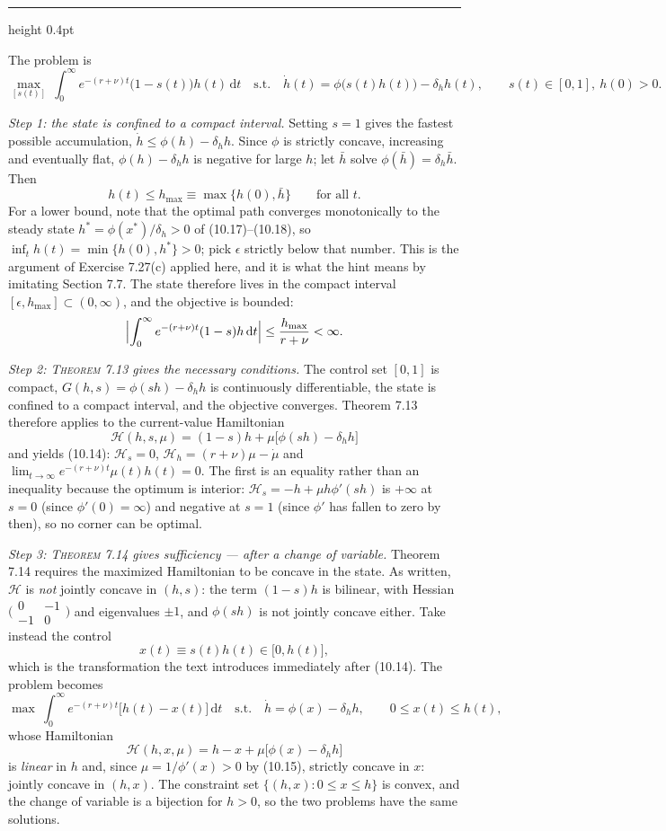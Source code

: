 \documentclass[11pt,letterpaper,reqno]{amsart}
\makeatletter
\newcommand{\dd}{\,\mathrm{d}}
\newcommand{\dt}[1]{\dot{#1}}
\newcommand{\as@head}[3]{%
  \par\addvspace{1.6ex}\penalty-200\relax
  \phantomsection
  \addcontentsline{toc}{subsection}{#1 #2\texorpdfstring{\ifx\relax#3\relax\else\quad #3\fi}{}}%
  {\color{RuleGrey}\hrule height 0.4pt}%
  \nobreak\vspace{0.8ex}\nobreak
  \noindent{\bfseries #1 #2}%
  \ifx\relax#3\relax\else\quad{\bfseries\itshape #3}\fi
  \par\nobreak\vspace{0.4ex}\nobreak
  \as@beginstatement
}
\newcommand{\as@beginstatement}{\begingroup\itshape\ignorespaces}
\newenvironment{aex}[2]{\as@head{Exercise}{#1}{#2}}{\par\addvspace{1.2ex}}
\newcommand{\bk}[1]{\textup{\textsc{#1}}}
\renewcommand{\as@beginstatement}{\ignorespaces}
\makeatother
\begin{document}
\begin{aex}{10.5}{}
The problem is
\[
\max_{[s(t)]}\ \int_{0}^{\infty}e^{-(r+\nu)t}\bigl(1-s(t)\bigr)h(t)\dd t
\quad\text{s.t.}\quad
\dt h(t)=\phi\bigl(s(t)h(t)\bigr)-\delta_hh(t),\qquad s(t)\in[0,1],\ h(0)>0 .
\]

\emph{Step 1: the state is confined to a compact interval.}  Setting $s=1$ gives the fastest
possible accumulation, $\dt h\le\phi(h)-\delta_hh$.  Since $\phi$ is strictly concave, increasing
and eventually flat, $\phi(h)-\delta_hh$ is negative for large $h$; let $\bar h$ solve
$\phi(\bar h)=\delta_h\bar h$.  Then
\[
h(t)\le h_{\max}\equiv\max\{h(0),\bar h\}\qquad\text{for all }t .
\]
For a lower bound, note that the optimal path converges monotonically to the steady state
$h^{*}=\phi(x^{*})/\delta_h>0$ of \bk{(10.17)}--\bk{(10.18)}, so
$\inf_{t}h(t)=\min\{h(0),h^{*}\}>0$; pick $\epsilon$ strictly below that number.  This is the
argument of Exercise 7.27(c) applied here, and it is what the hint means by imitating Section 7.7.
The state therefore lives in the compact interval $[\epsilon,h_{\max}]\subset(0,\infty)$, and the
objective is bounded:
\[
\Bigl|\int_{0}^{\infty}e^{-(r+\nu)t}(1-s)h\dd t\Bigr|\le\frac{h_{\max}}{r+\nu}<\infty .
\]

\emph{Step 2: \bk{Theorem 7.13} gives the necessary conditions.}  The control set $[0,1]$ is
compact, $G(h,s)=\phi(sh)-\delta_hh$ is continuously differentiable, the state is confined to a
compact interval, and the objective converges.  Theorem 7.13 therefore applies to the
current-value Hamiltonian
\[
\mathcal H(h,s,\mu)=(1-s)h+\mu\bigl[\phi(sh)-\delta_hh\bigr]
\]
and yields \bk{(10.14)}: $\mathcal H_s=0$, $\mathcal H_h=(r+\nu)\mu-\dt\mu$ and
$\lim_{t\to\infty}e^{-(r+\nu)t}\mu(t)h(t)=0$.  The first is an equality rather than an inequality
because the optimum is interior: $\mathcal H_s=-h+\mu h\phi'(sh)$ is $+\infty$ at $s=0$ (since
$\phi'(0)=\infty$) and negative at $s=1$ (since $\phi'$ has fallen to zero by then), so no corner
can be optimal.

\emph{Step 3: \bk{Theorem 7.14} gives sufficiency --- after a change of variable.}  Theorem 7.14
requires the maximized Hamiltonian to be concave in the state.  As written, $\mathcal H$ is
\emph{not} jointly concave in $(h,s)$: the term $(1-s)h$ is bilinear, with Hessian
$\bigl(\begin{smallmatrix}0&-1\\-1&0\end{smallmatrix}\bigr)$ and eigenvalues $\pm1$, and
$\phi(sh)$ is not jointly concave either.  Take instead the control
\[
x(t)\equiv s(t)h(t)\in\bigl[0,h(t)\bigr] ,
\]
which is the transformation the text introduces immediately after \bk{(10.14)}.  The problem
becomes
\[
\max\ \int_{0}^{\infty}e^{-(r+\nu)t}\bigl[h(t)-x(t)\bigr]\dd t
\quad\text{s.t.}\quad
\dt h=\phi(x)-\delta_hh,\qquad 0\le x(t)\le h(t) ,
\]
whose Hamiltonian
\[
\mathcal H(h,x,\mu)=h-x+\mu\bigl[\phi(x)-\delta_hh\bigr]
\]
is \emph{linear} in $h$ and, since $\mu=1/\phi'(x)>0$ by \bk{(10.15)}, strictly concave in $x$:
jointly concave in $(h,x)$.  The constraint set $\{(h,x):0\le x\le h\}$ is convex, and the change
of variable is a bijection for $h>0$, so the two problems have the same solutions.


\end{aex}
\end{document}
